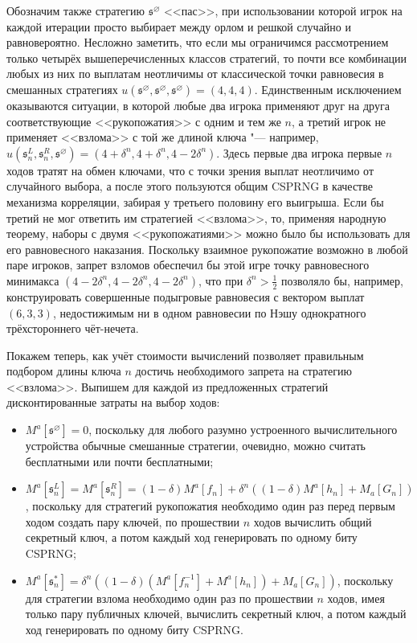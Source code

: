 Обозначим также стратегию $\mathfrak{s}^{\varnothing}$ <<пас>>, при использовании которой игрок на каждой итерации просто выбирает между орлом и решкой случайно и равновероятно. Несложно заметить, что если мы ограничимся рассмотрением только четырёх вышеперечисленных классов стратегий, то почти все комбинации любых из них по выплатам неотличимы от классической точки равновесия в смешанных стратегиях $u(\mathfrak{s}^{\varnothing}, \mathfrak{s}^{\varnothing}, \mathfrak{s}^{\varnothing}) = (4, 4, 4)$. Единственным исключением оказываются ситуации, в которой любые два игрока применяют друг на друга соответствующие <<рукопожатия>> с одним и тем же $n$, а третий игрок не применяет <<взлома>> с той же длиной ключа "--- например, $u(\mathfrak{s}^L_n, \mathfrak{s}^R_n, \mathfrak{s}^{\varnothing}) = (4 + \delta^n, 4 + \delta^n, 4 - 2 \delta^n)$. Здесь первые два игрока первые $n$ ходов тратят на обмен ключами, что с точки зрения выплат неотличимо от случайного выбора, а после этого пользуются общим CSPRNG в качестве механизма корреляции, забирая у третьего половину его выигрыша. Если бы третий не мог ответить им стратегией <<взлома>>, то, применяя народную теорему, наборы с двумя <<рукопожатиями>> можно было бы использовать для его равновесного наказания. Поскольку взаимное рукопожатие возможно в любой паре игроков, запрет взломов обеспечил бы этой игре точку равновесного минимакса $(4 - 2 \delta^n, 4 - 2 \delta^n, 4 - 2 \delta^n)$, что при $\delta^n > \frac{1}{2}$ позволяло бы, например, конструировать совершенные подыгровые равновесия с вектором выплат $(6, 3, 3)$, недостижимым ни в одном равновесии по Нэшу однократного трёхстороннего чёт-нечета.

Покажем теперь, как учёт стоимости вычислений позволяет правильным подбором длины ключа $n$ достичь необходимого запрета на стратегию <<взлома>>. Выпишем для каждой из предложенных стратегий дисконтированные затраты на выбор ходов:
\begin{itemize}
	\item $M^a[\mathfrak{s}^{\varnothing}] = 0$, поскольку для любого разумно устроенного вычислительного устройства обычные смешанные стратегии, очевидно, можно считать бесплатными или почти бесплатными;
	\item $M^a[\mathfrak{s}^L_n] = M^a[\mathfrak{s}^R_n] = (1 - \delta) M^a[f_n] + \delta ^ n ((1 - \delta) M^a[h_n] + M_a[G_n])$, поскольку для стратегий рукопожатия необходимо один раз перед первым ходом создать пару ключей, по прошествии $n$ ходов вычислить общий секретный ключ, а потом каждый ход генерировать по одному биту CSPRNG;
	\item $M^a[\mathfrak{s}^*_n] = \delta ^ n ((1 - \delta) (M^a[f_n^{-1}] + M^a[h_n]) + M_a[G_n])$, поскольку для стратегии взлома необходимо один раз по прошествии $n$ ходов, имея только пару публичных ключей, вычислить секретный ключ, а потом каждый ход генерировать по одному биту CSPRNG.
\end{itemize}

